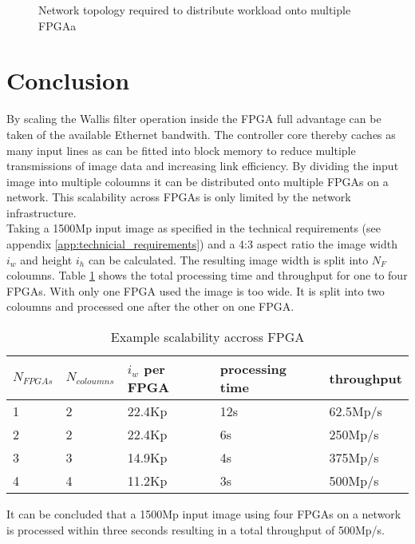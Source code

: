 \begin{figure}[b!]
    \centering
    \begin{adjustbox}{max height=5cm}
        
    \end{adjustbox}
    \caption{Network topology required to distribute workload onto multiple
    FPGAa}
    \label{fig:sca:network}
\end{figure}

\section{Conclusion}
By scaling the Wallis filter operation inside the FPGA full advantage can be
taken of the available Ethernet bandwith. The controller core thereby caches as
many input lines as can be fitted into block memory to reduce multiple
transmissions of image data and increasing link efficiency. By dividing the input
image into multiple coloumns it can be distributed onto multiple FPGAs on a
network. This scalability across FPGAs is only limited by the network
infrastructure.
\\


Taking a 1500Mp input image as specified in the technical requirements (see
appendix \ref{app:technicial_requirements}) and a 4:3 aspect ratio the image
width $i_w$ and height $i_h$ can be calculated. The resulting image width is
split into $N_F$ coloumns. Table \ref{tab:sca:exacrfpga} shows the total
processing time and throughput for one to four FPGAs. With only one FPGA used
the image is too wide. It is split into two coloumns and processed one after the
other on one FPGA.

\begin{table}[h!]
    \centering
    \begin{tabular}{l l l l l}
        \toprule
        $N_{FPGAs}$ & $N_{coloumns}$ & $i_w$ per FPGA &
        processing time & throughput \\
        \midrule
        1  & 2 &  22.4Kp & 12s & 62.5Mp/s \\
        2  & 2 &  22.4Kp & 6s  & 250Mp/s \\
        3  & 3 &  14.9Kp & 4s  & 375Mp/s \\
        4  & 4 &  11.2Kp & 3s  & 500Mp/s \\
        \bottomrule
    \end{tabular}
    \caption{Example scalability accross FPGA}
    \label{tab:sca:exacrfpga}
\end{table}

It can be concluded that a 1500Mp input image using four FPGAs on a network is
processed within three seconds resulting in a total throughput of 500Mp/s.

